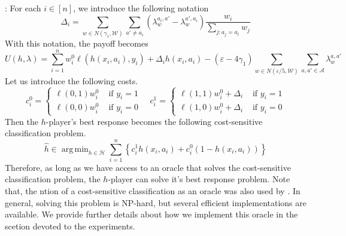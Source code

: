 \documentclass{article}
\renewcommand{\hat}{\widehat}
\newcommand{\set}[1]{\{#1\}}
\DeclareMathOperator*{\argmin}{arg\,min}
\newcommand{\WW}{\mathcal{W}}
\newcommand{\Ac}{\mathcal{A}}
\newcommand{\HH}{\mathcal{H}}
\newcommand{\eps}{\varepsilon}
\newcommand{\norm}[1]{\lVert #1 \rVert}
\begin{document}
: For each $i \in [n]$, we introduce the following notation
$$\Delta_i = \sum_{w \in N(\gamma_1,\WW)} \sum_{a' \neq a_i} \left(\lambda^{a_i,a'}_w - \lambda^{a',a_i}_w \right) \frac{w_i}{\sum_{j:a_j = a_i}w_j}$$
With this notation, the payoff becomes
$$U(h,\lambda) = \sum_{i=1}^n w^0_i \ell(h(x_i,a_i),y_i) + \Delta_i h(x_i,a_i) - (\eps - 4\gamma_1)\sum_{w \in N(\eps/5,\WW)} \sum_{a,a' \in \Ac} \lambda_w^{a,a'}$$
Let us introduce the following costs.
\begin{equation}
c^0_i = \left\{ \begin{array}{cc}
\ell(0,1)w^0_i & \text{ if } y_i = 1\\
\ell(0,0)w^0_i & \text{ if } y_i = 0
\end{array}\right. \quad 
c^1_i = \left\{ \begin{array}{cc}
\ell(1,1)w^0_i + \Delta_i & \text{ if } y_i = 1\\
\ell(1,0)w^0_i + \Delta_i & \text{ if } y_i = 0
\end{array}\right.
\end{equation}
Then the $h$-player's best response becomes the following cost-sensitive classification problem.
\begin{equation}
\hat{h} \in \argmin_{h \in \HH} \sum_{i=1}^n \left\{c^1_i h(x_i,a_i) + c^0_i (1 - h(x_i,a_i)) \right\}
\end{equation}
Therefore, as long as we have access to an oracle that solves the cost-sensitive classification problem, the $h$-player can solve it's best response problem. Note that, the ntion of a cost-sensitive classification as an oracle was also used by \cite{ABDL+18,KNRZ17}. In general, solving this problem is NP-hard, but several efficient implementations are available. We provide further details about how we implement this oracle in the scetion devoted to the experiments.


\end{document}
